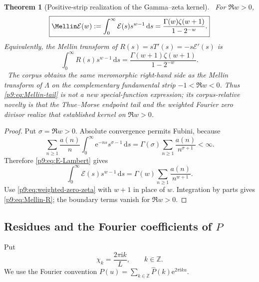 \documentclass[11pt]{article}
\numberwithin{equation}{section}
\newtheorem{theorem}{Theorem}[section]
\theoremstyle{definition}
\theoremstyle{remark}
\newcommand{\Z}{\mathbb Z}
\newcommand{\dd}{\,\mathrm d}
\newcommand{\e}{\mathrm e}
\newcommand{\ii}{\mathrm i}
\begin{document}
\begin{theorem}[Positive-strip realization of the Gamma--zeta kernel]
\label{p9:thm:Mellin-tail}
\statusN\ For $\Re w>0$,
\begin{equation}
 \boxed{
 \Mellin\mathcal E(w):=\int_0^\infty\mathcal E(s)s^{w-1}\dd s
 =\frac{\Gamma(w)\zeta(w+1)}{1-2^{-w}}.}                   \label{p9:eq:Mellin-tail}
\end{equation}
Equivalently, the Mellin transform of $R(s)=sT'(s)=-s\mathcal E'(s)$ is
\begin{equation}
 \int_0^\infty R(s)s^{w-1}\dd s
 =\frac{\Gamma(w+1)\zeta(w+1)}{1-2^{-w}}.                 \label{p9:eq:Mellin-R}
\end{equation}
\statusE\ The corpus obtains the same meromorphic right-hand side as the Mellin transform
of $\Lambda$ on the complementary fundamental strip $-1<\Re w<0$.  Thus
\eqref{p9:eq:Mellin-tail} is not a new special-function expression; its corpus-relative
novelty is that the Thue--Morse endpoint tail and the weighted Fourier zero divisor realize
that established kernel on $\Re w>0$.
\end{theorem}

\begin{proof}
Put $\sigma=\Re w>0$.  Absolute convergence permits Fubini, because
\[
 \sum_{n\ge1}\frac{a(n)}n
 \int_0^\infty\e^{-ns}s^{\sigma-1}\dd s
 =\Gamma(\sigma)\sum_{n\ge1}\frac{a(n)}{n^{\sigma+1}}<\infty.
\]
Therefore \eqref{p9:eq:E-Lambert} gives
\[
 \int_0^\infty\mathcal E(s)s^{w-1}\dd s
 =\Gamma(w)\sum_{n\ge1}\frac{a(n)}{n^{w+1}}.
\]
Use \eqref{p9:eq:weighted-zero-zeta} with $w+1$ in place of $w$.  Integration by parts gives
\eqref{p9:eq:Mellin-R}; the boundary terms vanish for $\Re w>0$.
\end{proof}

\subsection{Residues and the Fourier coefficients of $P$}
Put
\begin{equation}
 \chi_k=\frac{2\pi\ii k}{L},\qquad k\in\Z.                 \label{p9:eq:chi}
\end{equation}
We use the Fourier convention
$P(u)=\sum_{k\in\Z}\widehat P(k)\e^{2\pi\ii ku}$.
\end{document}

